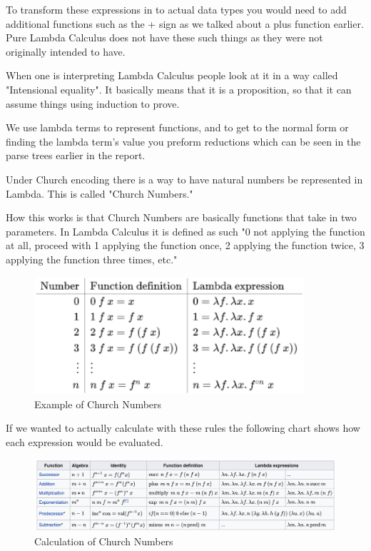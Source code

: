 \documentclass{article}
\begin{document}
\medskip\noindent
To transform these expressions in to actual data types you would need to add additional functions such as the + sign as we talked about a plus function earlier. Pure Lambda Calculus does not have these such things as they were not originally intended to have. 

\medskip\noindent
When one is interpreting Lambda Calculus people look at it in a way called "Intensional equality". It basically means that it is a proposition, so that it can assume things using induction to prove. 

\medskip\noindent
We use lambda terms to represent functions, and to get to the normal form or finding the lambda term's value you preform reductions which can be seen in the parse trees earlier in the report.\cite{CEN}

\medskip\noindent
Under Church encoding there is a way to have natural numbers be represented in Lambda. This is called "Church Numbers."

\medskip\noindent
How this works is that Church Numbers are basically functions that take in two parameters. In Lambda Calculus it is defined as such "0 not applying the function at all, proceed with 1 applying the function once, 2 applying the function twice, 3 applying the function three times, etc."

\medskip\noindent 
\begin{figure}[htp]
    \centering
    \includegraphics[width=10cm]{ChurchEncoding.png}
    \caption{Example of Church Numbers}
    \label{fig:Church Encodings}
\end{figure}
\cite{CEN}

\medskip\noindent
If we wanted to actually calculate with these rules the following chart shows how each expression would be evaluated.

\medskip\noindent 
\begin{figure}[htp]
    \centering
    \includegraphics[width=17cm]{Church Numbers.png}
    \caption{Calculation of Church Numbers}
    \label{fig:Church Numbers}
\end{figure}
\cite{CEN}
\end{document}
